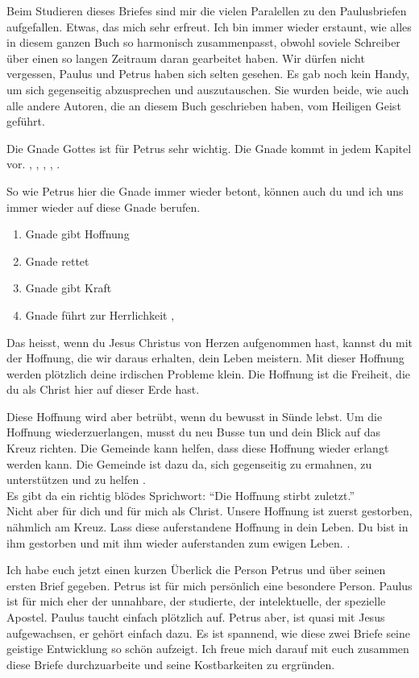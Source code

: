 \documentclass[fontsize=16pt]{mybib}
\begin{document}
Beim Studieren dieses Briefes sind mir die vielen Paralellen zu den Paulusbriefen aufgefallen. Etwas, das mich sehr erfreut. Ich bin immer wieder erstaunt, wie alles in diesem ganzen Buch so harmonisch zusammenpasst, obwohl soviele Schreiber über einen so langen Zeitraum daran gearbeitet haben. Wir dürfen nicht vergessen, Paulus und Petrus haben sich selten gesehen. Es gab noch kein Handy, um sich gegenseitig abzusprechen und auszutauschen. Sie wurden beide, wie auch alle andere Autoren, die an diesem Buch geschrieben haben, vom Heiligen Geist geführt.

Die Gnade Gottes ist für Petrus sehr wichtig. Die Gnade kommt in jedem Kapitel vor. , , , , .

So wie Petrus hier die Gnade immer wieder betont, können auch du und ich uns immer wieder auf diese Gnade berufen.
\begin{enumerate}
    \item Gnade gibt Hoffnung 
    \item Gnade rettet 
    \item Gnade gibt Kraft 
    \item Gnade führt zur Herrlichkeit , 
\end{enumerate}

Das heisst, wenn du Jesus Christus von Herzen aufgenommen hast, kannst du mit der Hoffnung, die wir daraus erhalten, dein Leben meistern. Mit dieser Hoffnung werden plötzlich deine irdischen Probleme klein. Die Hoffnung ist die Freiheit, die du als Christ hier auf dieser Erde hast.

Diese Hoffnung wird aber betrübt, wenn du bewusst in Sünde lebst. Um die Hoffnung wiederzuerlangen, musst du neu Busse tun und dein Blick auf das Kreuz richten. Die Gemeinde kann helfen, dass diese Hoffnung wieder erlangt werden kann. Die Gemeinde ist dazu da, sich gegenseitig zu ermahnen, zu unterstützen und zu helfen .\\
Es gibt da ein richtig blödes Sprichwort: \enquote{Die Hoffnung stirbt zuletzt.}\\
Nicht aber für dich und für mich als Christ. Unsere Hoffnung ist zuerst gestorben, nähmlich am Kreuz. Lass diese auferstandene Hoffnung in dein Leben. Du bist in ihm gestorben und mit ihm wieder auferstanden zum ewigen Leben. .

\begin{otsblock}[Ende]
    Ich habe euch jetzt einen kurzen Überlick die Person Petrus und über seinen ersten Brief gegeben.
    Petrus ist für mich persönlich eine besondere Person. Paulus ist für mich eher der unnahbare, der studierte, der intelektuelle, der spezielle Apostel. Paulus taucht einfach plötzlich auf. Petrus aber, ist quasi mit Jesus aufgewachsen, er gehört einfach dazu. Es ist spannend, wie diese zwei Briefe seine geistige Entwicklung so schön aufzeigt. Ich freue mich darauf mit euch zusammen diese Briefe durchzuarbeite und seine Kostbarkeiten zu ergründen. 
\end{otsblock}
\end{document}
